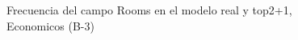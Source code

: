 \begin{figure}[H]
    \centering
    
    \caption{Frecuencia del campo Rooms en el modelo real y top2+1, Economicos (B-3)}
    \label{frecuency-Rooms-top2+1}
\end{figure}